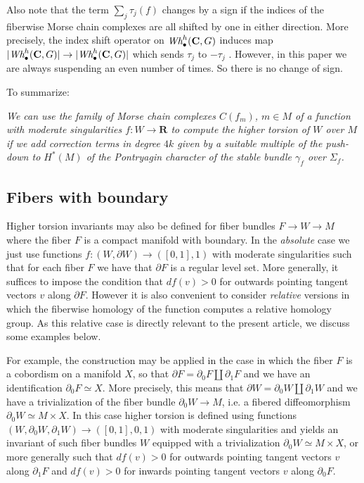 \documentclass{amsart}
\def\bC{\mathbf{C}}
\def\bR{\mathbf{R}}
\theoremstyle{definition}
\theoremstyle{remark}
\newtheorem{inductive lemma}[theorem]{Inductive Lemma}
\begin{document}
Also note that the term $\sum_j\tau_j(f)$ changes by a sign if the indices of the fiberwise Morse chain complexes are all shifted by one in either direction. More precisely, the index shift operator on $\text{\em Wh}_\bullet^h(\bC,G)$ induces map $|\text{\em Wh}_\bullet^h(\bC,G)| \to |\text{\em Wh}_\bullet^h(\bC,G)|$ which sends $\tau_j$ to $-\tau_j$ \cite[Theorem 3.10]{I05}. However, in this paper we are always suspending an even number of times. So there is no change of sign.



To summarize: 

{\em We can use the family of Morse chain complexes $C(f_m)$, $m \in M$ of a function with moderate singularities $f:W \to \bR$ to compute the higher torsion of $W$ over $M$ if we add correction terms in degree $4k$ given by a suitable multiple of the push-down to $H^\ast(M)$ of the Pontryagin character of the stable bundle $\gamma_f$ over $\Sigma_f$.}


\subsection{Fibers with boundary}\label{sec: rel torsion}

Higher torsion invariants may also be defined for fiber bundles $F \to W \to M$ where the fiber $F$ is a compact manifold with boundary. In the {\em absolute} case we just use functions $f:(W,\partial W) \to ([0,1],1)$ with moderate singularities such that for each fiber $F$ we have that $\partial F$ is a regular level set. More generally, it suffices to impose the condition that $df(v)>0$ for outwards pointing tangent vectors $v$ along $\partial F$. However it is also convenient to consider {\em relative} versions in which the fiberwise homology of the function computes a relative homology group. As this relative case is directly relevant to the present article, we discuss some examples below. 

For example, the construction may be applied in the case in which the fiber $F$ is a cobordism on a manifold $X$, so that $\partial F = \partial_0 F \coprod \partial_1 F$ and we have an identification $\partial_0 F \simeq X$. More precisely, this means that $\partial W =\partial_0 W \coprod \partial_1 W $ and we have a trivialization of the fiber bundle $\partial_0 W \to M$, i.e. a fibered diffeomorphism $\partial_0 W \simeq M \times X$. In this case higher torsion is defined using functions $(W,\partial_0W,\partial_1 W) \to ([0,1],0,1)$ with moderate singularities and yields an invariant of such fiber bundles $W$ equipped with a trivialization  $\partial_0 W \simeq M \times X$, or more generally such that $df(v)>0$ for outwards pointing tangent vectors $v$ along $\partial_1 F$ and $df(v)>0$ for inwards pointing tangent vectors $v$ along $\partial_0 F$.
\end{document}
